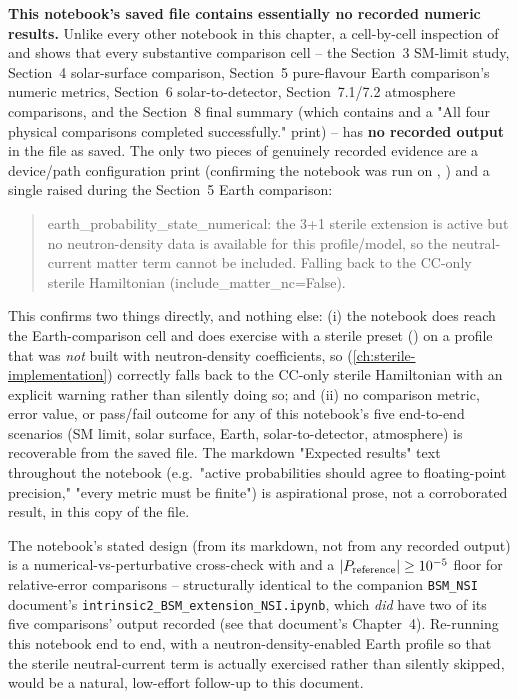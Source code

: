 \begin{notebox}
\textbf{This notebook's saved file contains essentially no recorded
numeric results.} Unlike every other notebook in this chapter, a
cell-by-cell inspection of  and 
shows that every substantive comparison cell -- the Section~3 SM-limit
study, Section~4 solar-surface comparison, Section~5 pure-flavour Earth
comparison's numeric metrics, Section~6 solar-to-detector, Section~7.1/7.2
atmosphere comparisons, and the Section~8 final summary (which contains
 and a
"All four physical comparisons completed successfully." print) -- has
\textbf{no recorded output} in the file as saved. The only two pieces of
genuinely recorded evidence are a device/path configuration print
(confirming the notebook was run on , )
and a single  raised during the Section~5 Earth
comparison:
\begin{quote}
\ttfamily\small
earth\_probability\_state\_numerical: the 3+1 sterile extension is active
but no neutron-density data is available for this profile/model, so the
neutral-current matter term cannot be included. Falling back to the
CC-only sterile Hamiltonian (include\_matter\_nc=False).
\end{quote}
This confirms two things directly, and nothing else: (i) the notebook does
reach the Earth-comparison cell and does exercise
 with a sterile preset
() on a profile that was
\emph{not} built with neutron-density coefficients, so
 (\cref{ch:sterile-implementation})
correctly falls back to the CC-only sterile Hamiltonian with an explicit
warning rather than silently doing so; and (ii) no comparison metric,
error value, or pass/fail outcome for any of this notebook's five
end-to-end scenarios (SM limit, solar surface, Earth, solar-to-detector,
atmosphere) is recoverable from the saved file. The markdown "Expected
results" text throughout the notebook (e.g.\ "active probabilities should
agree to floating-point precision," "every metric must be finite") is
aspirational prose, not a corroborated result, in this copy of the file.
\end{notebox}

\begin{implbox}
The notebook's stated design (from its markdown, not from any recorded
output) is a numerical-vs-perturbative cross-check with
 and a $|P_{\rm reference}|\geq10^{-5}$
floor for relative-error comparisons -- structurally identical to the
companion \texttt{BSM\_NSI} document's \texttt{intrinsic2\_BSM\_extension\_NSI.ipynb},
which \emph{did} have two of its five comparisons' output recorded (see
that document's Chapter~4). Re-running this notebook end to end, with a
neutron-density-enabled Earth profile so that the sterile neutral-current
term is actually exercised rather than silently skipped, would be a
natural, low-effort follow-up to this document.
\end{implbox}

